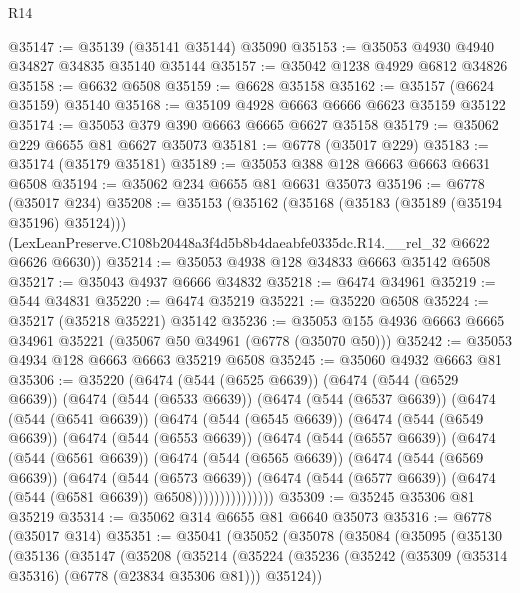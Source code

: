 \begin{lexlean}{R14}
\begin{coremodule}
@35147 := @35139 (@35141 @35144) @35090
@35153 := @35053 @4930 @4940 @34827 @34835 @35140 @35144
@35157 := @35042 @1238 @4929 @6812 @34826
@35158 := @6632 @6508
@35159 := @6628 @35158
@35162 := @35157 (@6624 @35159) @35140
@35168 := @35109 @4928 @6663 @6666 @6623 @35159 @35122
@35174 := @35053 @379 @390 @6663 @6665 @6627 @35158
@35179 := @35062 @229 @6655 @81 @6627 @35073
@35181 := @6778 (@35017 @229)
@35183 := @35174 (@35179 @35181)
@35189 := @35053 @388 @128 @6663 @6663 @6631 @6508
@35194 := @35062 @234 @6655 @81 @6631 @35073
@35196 := @6778 (@35017 @234)
@35208 := @35153
    (@35162
      (@35168 (@35183 (@35189 (@35194 @35196) @35124)))
      (LexLeanPreserve.C108b20448a3f4d5b8b4daeabfe0335dc.R14.__rel_32 @6622 @6626 @6630))
@35214 := @35053 @4938 @128 @34833 @6663 @35142 @6508
@35217 := @35043 @4937 @6666 @34832
@35218 := @6474 @34961
@35219 := @544 @34831
@35220 := @6474 @35219
@35221 := @35220 @6508
@35224 := @35217 (@35218 @35221) @35142
@35236 := @35053 @155 @4936 @6663 @6665 @34961 @35221 (@35067 @50 @34961 (@6778 (@35070 @50)))
@35242 := @35053 @4934 @128 @6663 @6663 @35219 @6508
@35245 := @35060 @4932 @6663 @81
@35306 := @35220
    (@6474
      (@544 (@6525 @6639))
      (@6474
        (@544 (@6529 @6639))
        (@6474
          (@544 (@6533 @6639))
          (@6474
            (@544 (@6537 @6639))
            (@6474
              (@544 (@6541 @6639))
              (@6474
                (@544 (@6545 @6639))
                (@6474
                  (@544 (@6549 @6639))
                  (@6474
                    (@544 (@6553 @6639))
                    (@6474
                      (@544 (@6557 @6639))
                      (@6474
                        (@544 (@6561 @6639))
                        (@6474
                          (@544 (@6565 @6639))
                          (@6474
                            (@544 (@6569 @6639))
                            (@6474
                              (@544 (@6573 @6639))
                              (@6474
                                (@544 (@6577 @6639))
                                (@6474 (@544 (@6581 @6639)) @6508)))))))))))))))
@35309 := @35245 @35306 @81 @35219
@35314 := @35062 @314 @6655 @81 @6640 @35073
@35316 := @6778 (@35017 @314)
@35351 := @35041
    (@35052
      (@35078
        (@35084
          (@35095
            (@35130
              (@35136
                (@35147
                  (@35208
                    (@35214
                      (@35224
                        (@35236
                          (@35242 (@35309 (@35314 @35316) (@6778 (@23834 @35306 @81))) @35124))

\end{coremodule}
\end{lexlean}
